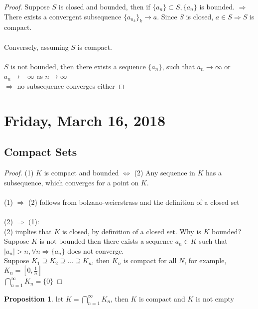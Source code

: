 \documentclass[12pt]{article}
\theoremstyle{plain}
\theoremstyle{definition}
\newtheorem{proposition}[theorem]{Proposition}
\begin{document}
\begin{proof}
	Suppose $S$ is closed and bounded, then if $\{ a_n \} \subset S, \{ a_n \}$ is bounded. $\Longrightarrow$ There exists a convergent subsequence $\{ a_{n_k} \}_k \to a$. Since $S$ is closed, $a \in S \Longrightarrow S$ is compact.\\
	\\
	Conversely, assuming $S$ is compact.\\
	\\
	$S$ is not bounded, then there exists a sequence $\{ a_n \}$, such that $a_n \to \infty$ or $a_n \to -\infty$ as $n \to \infty$\\
	$\Longrightarrow$ no subsequence converges either
\end{proof}






\newpage
\section{Friday, March 16, 2018}

\subsection{Compact Sets}
\begin{proof}
	(1) $K$ is compact and bounded $\Longleftrightarrow$ (2) Any sequence in $K$ has a subsequence, which converges for a point on $K$.\\
	\\
	(1) $\Longrightarrow$ (2) follows from bolzano-weierstrass and the definition of a closed set\\
	\\
	(2) $\Longrightarrow$ (1):\\
	(2) implies that $K$ is closed, by definition of a closed set. Why is $K$ bounded? Suppose $K$ is not bounded then there exists a sequence $a_n \in K$ such that $|a_n| > n, \forall n \Longrightarrow \{ a_n \}$ does not converge.\\
	Suppose $K_1 \supseteq K_2 \supseteq ... \supseteq K_n$, then $K_n$ is compact for all $N$, for example, $K_n = [0, \frac{1}{n}]$
	\\
	$\bigcap^\infty_{n=1} K_n = \{ 0 \}$
\end{proof}

\begin{proposition}
	let $K = \bigcap^\infty_{n=1} K_n$, then $K$ is compact and $K$ is not empty
\end{proposition}
\end{document}

